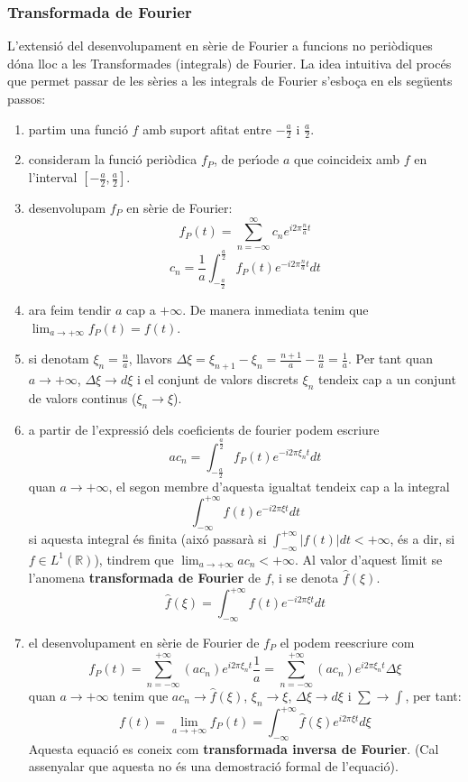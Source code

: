 \documentclass{article}
\def\R{\mathbb R}
\begin{document}
\subsubsection{Transformada de Fourier}
L'extensi\'o del desenvolupament en s\`erie de Fourier a funcions 
no peri\`odiques d\'ona lloc a les Transformades (integrals) de Fourier.
La idea intuitiva del proc\'es que permet passar de les s\`eries a les 
integrals de Fourier s'esbo\c{c}a en els seg\"uents passos:
\begin{enumerate}
\item partim una funci\'o $f$ amb suport afitat entre $-\frac{a}{2}$
i $\frac{a}{2}$.
\item consideram la funci\'o peri\`odica $f_P$, de per\'\i ode $a$
que coincideix amb $f$ en l'interval $[-\frac{a}{2}, \frac{a}{2}]$.
\item desenvolupam $f_P$ en s\`erie de Fourier:
\[
f_P(t)=\sum_{n=-\infty}^{\infty} c_n e^{i2\pi\frac{n}{a}t}
\]
\[
c_n=\frac{1}{a} \int_{-\frac{a}{2}}^{\frac{a}{2}} f_P(t)
e^{-i2\pi\frac{n}{a}t} dt
\]
\item ara feim tendir $a$ cap a $+\infty$. De manera inmediata tenim que
$\lim_{a \rightarrow +\infty} f_P(t)=f(t)$.
\item si denotam $\xi_n=\frac{n}{a}$, llavors 
$\Delta \xi = \xi_{n+1}-\xi_n=\frac{n+1}{a}-\frac{n}{a}=\frac{1}{a}$.
Per tant quan $a \rightarrow +\infty$, $\Delta \xi \rightarrow d\xi$ i
el conjunt de valors discrets $\xi_n$ tendeix cap a un conjunt de valors
continus ($\xi_n \rightarrow \xi$).
\item a partir de l'expressi\'o dels coeficients de fourier podem escriure
\[
a c_n=\int_{-\frac{a}{2}}^{\frac{a}{2}} f_P(t)
e^{-i2\pi\xi_n t} dt
\]
\noindent
quan $a \rightarrow +\infty$, el segon membre d'aquesta igualtat tendeix 
cap a la integral
\[
\int_{-\infty}^{+\infty} f(t) e^{- i 2\pi \xi t} dt
\]
\noindent
si aquesta integral \'es finita (aix\'o passar\`a si 
$\int_{-\infty}^{+\infty} |f(t)| dt < +\infty$, \'es a dir,
si $f \in L^1(\R)$), tindrem que 
$\lim_{a \rightarrow +\infty} a c_n < +\infty$. Al valor d'aquest 
l\'\i mit se l'anomena {\bf transformada de Fourier} de $f$, i se
denota $\hat{f}(\xi)$.
\begin{equation}
\label{FT}
\hat{f}(\xi)=\int_{-\infty}^{+\infty} f(t) e^{-i 2\pi \xi t} dt
\end{equation}
\item el desenvolupament en s\`erie de Fourier de $f_P$ el podem reescriure
com
\[
f_P(t)=\sum_{n=-\infty}^{+\infty} (a c_n) e^{i 2 \pi \xi_n t} \frac{1}{a} =
 \sum_{n=-\infty}^{+\infty} (a c_n) e^{i 2 \pi \xi_n t} \Delta \xi
\]
\noindent
quan $a \rightarrow +\infty$ tenim que $a c_n \rightarrow \hat{f}(\xi)$,
$\xi_n \rightarrow \xi$, $\Delta \xi \rightarrow d\xi$ i 
$\sum \rightarrow \int$, per tant:
\begin{equation}
\label{IFT}
f(t)=\lim_{a \rightarrow +\infty} f_P(t)=\int_{-\infty}^{+\infty}
\hat{f}(\xi) e^{i 2 \pi \xi t} d\xi
\end{equation}
\noindent
Aquesta equaci\'o es coneix com {\bf transformada inversa de Fourier}.
(Cal assenyalar que aquesta no \'es una demostraci\'o formal de l'equaci\'o).
\end{enumerate}
\end{document}

